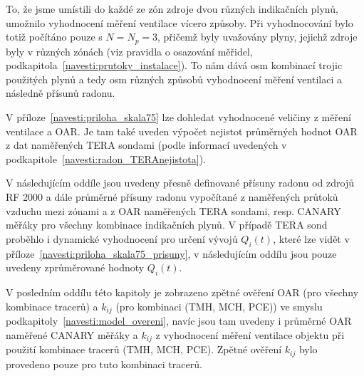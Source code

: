 To, že jsme umístili do každé ze zón zdroje dvou různých indikačních plynů, umožnilo vyhodnocení měření ventilace vícero způsoby. Při vyhodnocování bylo totiž počítáno pouze s $N=N_p=3$, přičemž byly uvažovány plyny, jejichž zdroje byly v různých zónách (viz pravidla o osazování měřidel, podkapitola~\ref{navesti:prutoky_instalace}). To nám dává osm kombinací trojic použitých plynů a tedy osm různých způsobů vyhodnocení měření ventilaci a následně přísunů radonu.

V příloze~\ref{navesti:priloha_skala75} lze dohledat vyhodnocené veličiny z měření ventilace a OAR. Je tam také uveden výpočet nejistot průměrných hodnot OAR z dat naměřených TERA sondami (podle informací uvedených v podkapitole~\ref{navesti:radon_TERAnejistota}). 

V následujícím oddíle jsou uvedeny přesně definované přísuny radonu od zdrojů RF 2000 a dále průměrné přísuny radonu vypočítané z naměřených průtoků vzduchu mezi zónami a z OAR naměřených TERA sondami, resp. CANARY měřáky pro všechny kombinace indikačních plynů. V případě TERA sond proběhlo i dynamické vyhodnocení pro určení vývojů $Q_i(t)$, které lze vidět v příloze~\ref{navesti:priloha_skala75_prisuny}, v následujícím oddílu jsou pouze uvedeny zprůměrované hodnoty $Q_i(t)$.

V posledním oddílu této kapitoly je zobrazeno zpětné ověření OAR (pro všechny kombinace tracerů) a $k_{ij}$ (pro kombinaci (TMH, MCH, PCE)) ve smyslu podkapitoly~\ref{navesti:model_overeni}, navíc jsou tam uvedeny i průměrné OAR naměřené CANARY měřáky a $k_{ij}$ z vyhodnocení měření ventilace objektu při použití kombinace tracerů (TMH, MCH,
PCE). Zpětné ověření $k_{ij}$ bylo provedeno pouze pro tuto kombinaci tracerů.


